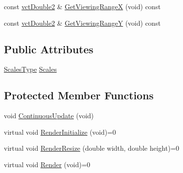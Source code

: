 {\bf }\par
\begin{DoxyCompactItemize}
\item 
const \hyperlink{vct_fixed_size_vector_types_8h_afc0fdcc41cbe8b043747612501610812}{vct\+Double2} \& \hyperlink{classvct_plot2_d_base_aded2fefaf32d6d3d299c2dd0e833d32a}{Get\+Viewing\+Range\+X} (void) const 
\item 
const \hyperlink{vct_fixed_size_vector_types_8h_afc0fdcc41cbe8b043747612501610812}{vct\+Double2} \& \hyperlink{classvct_plot2_d_base_a9fd9f4facf8c08c2d2ed44a141f99a48}{Get\+Viewing\+Range\+Y} (void) const 
\end{DoxyCompactItemize}

\subsection*{Public Attributes}
\begin{DoxyCompactItemize}
\item 
\hyperlink{classvct_plot2_d_base_a0f7274ebd354a06e7102b164f60b7d94}{Scales\+Type} \hyperlink{classvct_plot2_d_base_a614a16e1e6f461d76aeba5daf4525b08}{Scales}
\end{DoxyCompactItemize}
\subsection*{Protected Member Functions}
\begin{DoxyCompactItemize}
\item 
void \hyperlink{classvct_plot2_d_base_afce628827d8e62844c7219ee4ed1cc6e}{Continuous\+Update} (void)
\end{DoxyCompactItemize}
{\bf }\par
\begin{DoxyCompactItemize}
\item 
virtual void \hyperlink{classvct_plot2_d_base_ab2287bbdcb6b39903716a573f0bc6a70}{Render\+Initialize} (void)=0
\item 
virtual void \hyperlink{classvct_plot2_d_base_a7bba3cf050792375d7ce02fc87f3756e}{Render\+Resize} (double width, double height)=0
\item 
virtual void \hyperlink{classvct_plot2_d_base_af17c67a35ecebb9a41159fe936237a09}{Render} (void)=0
\end{DoxyCompactItemize}

